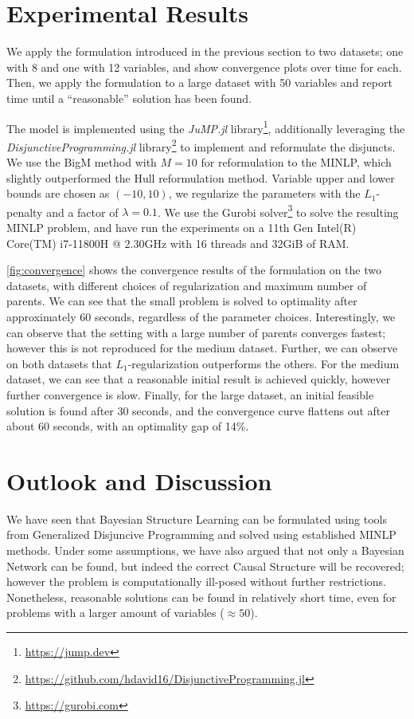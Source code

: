 \documentclass[11pt]{article}
\begin{document}
\section{Experimental Results}
\label{sec:org06dfb09}
We apply the formulation introduced in the previous section to two datasets; one with 8 and one with 12 variables, and show convergence plots over time for each.
Then, we apply the formulation to a large dataset with 50 variables and report time until a ``reasonable'' solution has been found.

The model is implemented using the \emph{JuMP.jl} library\footnote{\url{https://jump.dev}}, additionally leveraging the \emph{DisjunctiveProgramming.jl} library\footnote{\url{https://github.com/hdavid16/DisjunctiveProgramming.jl}} to implement and reformulate the disjuncts.
We use the BigM method with \(M = 10\) for reformulation to the MINLP, which slightly outperformed the Hull reformulation method.
Variable upper and lower bounds are chosen as \((-10, 10)\), we regularize the parameters with the \(L_1\)-penalty and a factor of \(\lambda=0.1\).
We use the Gurobi solver\footnote{\url{https://gurobi.com}} to solve the resulting MINLP problem, and have run the experiments on a 11th Gen Intel(R) Core(TM) i7-11800H @ 2.30GHz with 16 threads and 32GiB of RAM.



\cref{fig:convergence} shows the convergence results of the formulation on the two datasets, with different choices of regularization and maximum number of parents.
We can see that the small problem is solved to optimality after approximately 60 seconds, regardless of the parameter choices.
Interestingly, we can observe that the setting with a large number of parents converges fastest; however this is not reproduced for the medium dataset.
Further, we can observe on both datasets that \(L_1\)-regularization outperforms the others.
For the medium dataset, we can see that a reasonable initial result is achieved quickly, however further convergence is slow.
Finally, for the large dataset, an initial feasible solution is found after 30 seconds, and the convergence curve flattens out after about 60 seconds, with an optimality gap of 14\%.


\section{Outlook and Discussion}
\label{sec:org2570dbe}
We have seen that Bayesian Structure Learning can be formulated using tools from Generalized Disjuncive Programming and solved using established MINLP methods.
Under some assumptions, we have also argued that not only a Bayesian Network can be found, but indeed the correct Causal Structure will be recovered; however the problem is computationally ill-posed without further restrictions.
Nonetheless, reasonable solutions can be found in relatively short time, even for problems with a larger amount of variables (\(\approx 50\)).
\end{document}

